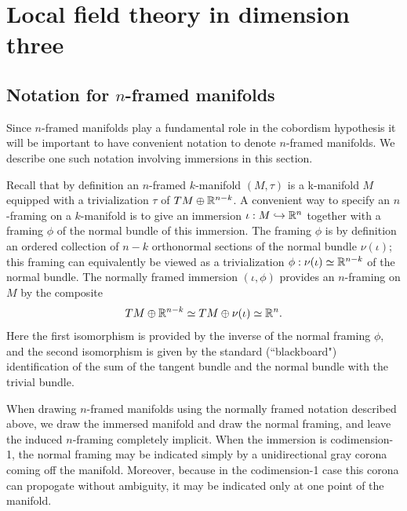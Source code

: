 \documentclass{amsart}
\begin{document}
\section{Local field theory in dimension three} \label{sec-lft}



\subsection{Notation for $n$-framed manifolds} 

Since $n$-framed manifolds play a fundamental role in the cobordism hypothesis it will be important to have convenient notation to denote $n$-framed manifolds.  We describe one such notation involving immersions in this section.

Recall that by definition an $n$-framed $k$-manifold $(M,\tau)$ is a k-manifold $M$ equipped with a trivialization $\tau$ of $TM \oplus \mathbb R^{n-k}$.  A convenient way to specify an $n$-framing on a $k$-manifold is to give an immersion $\iota: M \hookrightarrow \mathbb R^n$ together with a framing $\phi$ of the normal bundle of this immersion.  The framing $\phi$ is by definition an ordered collection of $n-k$ orthonormal sections of the normal bundle $\nu(\iota)$; this framing can equivalently be viewed as a trivialization $\phi: \nu(\iota) \simeq \mathbb R^{n-k}$ of the normal bundle.  The normally framed immersion $(\iota, \phi)$ provides an $n$-framing on $M$ by the composite
\[TM \oplus \mathbb R^{n-k} \simeq TM \oplus \nu(\iota) \simeq  \mathbb R^n.\]
Here the first isomorphism is provided by the inverse of the normal framing $\phi$, and the second isomorphism is given by the standard (``blackboard") identification of the sum of the tangent bundle and the normal bundle with the trivial bundle.

When drawing $n$-framed manifolds using the normally framed notation described above, we draw the immersed manifold and draw the normal framing, and leave the induced $n$-framing completely implicit.  When the immersion is codimension-1, the normal framing may be indicated simply by a unidirectional gray corona coming off the manifold.  Moreover, because in the codimension-1 case this corona can propogate without ambiguity, it may be indicated only at one point of the manifold.
\end{document}

